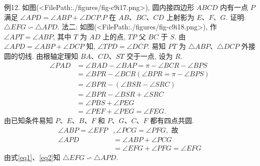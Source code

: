例12. 如图(<FilePath:./figures/fig-c9i17.png>), 圆内接四边形 $A B C D$ 内有一点 $P$ 满足 $\angle A P D=\angle A B P+\angle D C P . P$ 在 $A B 、 B C 、 C D$ 上射影为 $E 、 F 、 G$. 证明: $\triangle E F G \backsim \triangle A P D$.
法二: 如图(<FilePath:./figures/fig-c9i18.png>), 作 $\angle A P T=\angle A B P$, 其中 $T$ 为 $A D$ 上的点, $T P$ 父 $B C$ 于 $S$.
由 $\angle A P D=\angle A B P+\angle D C P$ 知, $\angle T P D=\angle D C P$.
易知 $P T$ 为 $\triangle A B P 、 \triangle D C P$ 外接圆的切线.
由根轴定理知 $B A 、 C D 、 S T$ 交于一点, 设为 $R$.
$$
\begin{aligned}
\angle P A D & =\angle B A D-\angle B A P=\pi-\angle B C R-\angle B P S \\
& =\angle B P R-\angle B C R(\angle B P R=\pi-\angle B P S) \\
& =\angle B P R-(\angle B S R-\angle S R C) \\
& =\angle B P R-\angle B S R+\angle S R C \\
& =\angle P B S+\angle P E G \\
& =\angle P E F+\angle P E G=\angle F E G .
\end{aligned} \label{eq1}
$$
由已知条件易知 $P 、 E 、 B 、 F$ 和 $P 、 G 、 C 、 F$ 都有四点共圆.
$$
\begin{aligned}
\angle A B P=\angle E F P & , \angle P C G=\angle P F G, \text { 故 } \\
\angle A P D & =\angle A B P+\angle P C G \\
& =\angle E F G+\angle P F G=\angle E F G
\end{aligned} \label{eq2}
$$
由式\ref{eq1}、\ref{eq2}知 $\triangle E F G \backsim \triangle A P D$.



